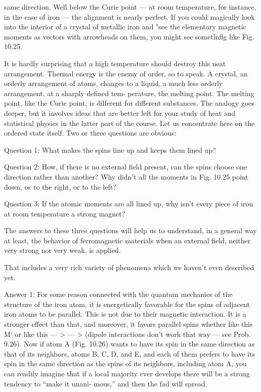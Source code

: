 {{{%
 

same direction. Well below the Curie point --- at room temperature,
for instance, in the case of iron --- the alignment is nearly perfect.
If you could magically look into the interior of a crystal of metallic
iron and "see the elementary magnetic moments as vectors with
arrowheads on them, you might see sometlnflg like Fig. 10.25.

It is hardly surprising that a high temperature should destroy this
neat arrangement. Thermal energy is the enemy of order, so
to speak. A crystal, an orderly arrangement of atoms, changes to a
liquid, a much less orderly arrangement, at a sharply defined tem-
perature, the melting point. The melting point, like the Curie point,
is dilferent for different substances. The analogy goes deeper, but it
involves ideas that are better left for your study of heat and statistical
physics in the latter part of the course. Let us concentrate here on
the ordered state itself. Two or three questions are obvious:

Question 1: What makes the spins line up and keeps them lined
up?

Question 2: How, if there is no external field present, can the
spins choose one direction rather than another? Why didn't all the
moments in Fig. 10.25 point down, or to the right, or to the left?

Question 3: If the atomic moments are all lined up, why isn't every
piece of iron at room temperature a strong magnet?

The answers to these three questions will help us to understand,
in a general way at least, the behavior of ferromagnetic materials
when an external field, neither very strong nor very weak, is applied.

That includes a very rich variety of phenomena which we haven't
even described yet.

Answer 1: For some reason connected with the quantum mechanics
of the structure of the iron atom, it is energetically favorable
for the spins of adjacent iron atoms to be parallel. This is not due
to their magnetic interaction. It is a stronger effect than that, and
moreover, it favors parallel spins whether like this M‘ or like this  --- > --- >
(dipole interactions don't work that way --- see Prob. 9.26). Now if
atom A (Fig. 10.26) wants to have its spin in the same direction as
that of its neighbors, atoms B, C, D, and E, and each of them prefers
to have its spin in the same direction as the spins of its neighbors,
including atom A, you can readily imagine that if a local majority
ever develops there will be a strong tendency to ``make it unani-
mous,'' and then the fad will spread.

}}}
